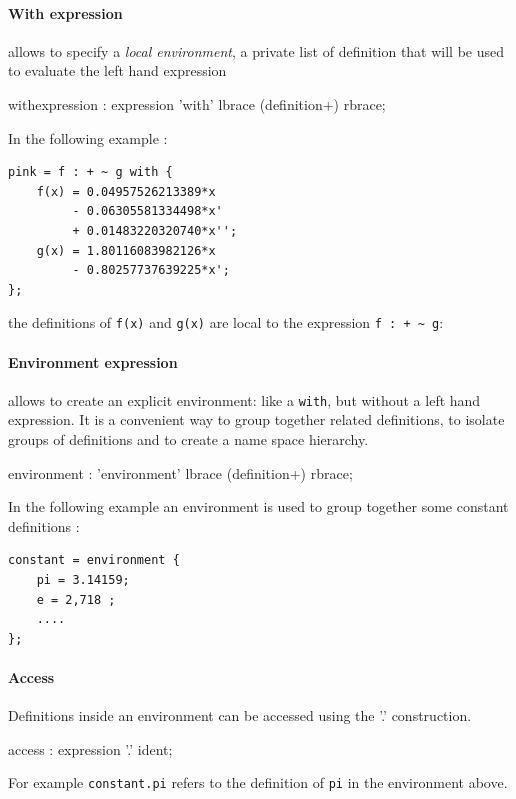 \documentclass{article}
\begin{document}
\paragraph{With expression}allows to specify a \textit{local environment}, a private list of definition that will be used to evaluate the left hand expression
\begin{rail}
withexpression : expression 'with' lbrace (definition+) rbrace;
\end{rail}

In the following example :
\begin{lstlisting}
pink = f : + ~ g with {
	f(x) = 0.04957526213389*x 
		 - 0.06305581334498*x' 
         + 0.01483220320740*x'';
	g(x) = 1.80116083982126*x 
		 - 0.80257737639225*x';
};
\end{lstlisting}
the definitions of \lstinline'f(x)' and \lstinline'g(x)' are local to the expression \lstinline'f : + ~ g':

\paragraph{Environment expression} allows to create an explicit environment: like a \lstinline'with', but without a left hand expression. It is a convenient way to group together related definitions, to isolate groups of definitions and to create a name space hierarchy. 

\begin{rail}
environment : 'environment' lbrace (definition+) rbrace; 
\end{rail}

In the following example an environment is used to group together some constant definitions :

\begin{lstlisting}
constant = environment {
	pi = 3.14159;
	e = 2,718 ;
	....
};
\end{lstlisting}

\paragraph{Access} Definitions inside an environment can be accessed using 
the '.' construction. 

\begin{rail}
access :    expression '.' ident;       
\end{rail}

For example \lstinline'constant.pi' refers to the definition of \lstinline'pi' in the environment above.
\end{document}
